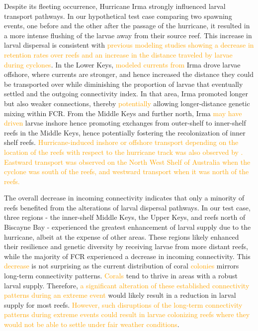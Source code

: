 \documentclass[fleqn,10pt]{wlscirep}
\newcommand{\modif}[1]{\textcolor{orange}{#1}}
\begin{document}
Despite its fleeting occurrence, Hurricane Irma strongly influenced larval transport pathways. In our hypothetical test case comparing two spawning events, one before and the other after the passage of the hurricane, it resulted in a more intense flushing of the larvae away from their source reef. This increase in larval dispersal is consistent with \modif{previous modeling studies showing a decrease in retention rates over reefs \cite{grimaldi2022hydrodynamic} and an increase in the distance traveled by larvae \citep{radford2014cyclones} during cyclones}. In the Lower Keys, \modif{modeled currents from} Irma drove larvae offshore, where currents are stronger, and hence increased the distance they could be transported over while diminishing the proportion of larvae that eventually settled and the outgoing connectivity index. In that area, Irma promoted longer but also weaker connections, thereby \modif{potentially} allowing longer-distance genetic mixing within FCR. From the Middle Keys and further north, Irma \modif{may have driven} larvae inshore hence promoting exchanges from outer-shelf to inner-shelf reefs in the Middle Keys, hence potentially fostering the recolonization of inner shelf reefs. \modif{Hurricane-induced inshore or offshore transport depending on the location of the reefs with respect to the hurricane track was also observed by \citep{radford2014cyclones}. Eastward transport was observed on the North West Shelf of Australia when the cyclone was south of the reefs, and westward transport when it was north of the reefs.}

The overall decrease in incoming connectivity indicates that only a minority of reefs benefited from the alterations of larval dispersal pathways. In our test case, three regions - the inner-shelf Middle Keys, the Upper Keys, and reefs north of Biscayne Bay - experienced the greatest enhancement of larval supply due to the hurricane, albeit at the expense of other areas. These regions likely enhanced their resilience and genetic diversity by receiving larvae from more distant reefs, while the majority of FCR experienced a decrease in incoming connectivity. This \modif{decrease} is not surprising as the current distribution of coral \modif{colonies} mirrors long-term connectivity patterns. \modif{Corals} tend to thrive in areas with a robust larval supply. Therefore, \modif{a significant alteration of these established connectivity patterns during an extreme event} would likely result in a reduction in larval supply for most reefs. \modif{However, such disruptions of the long-term connectivity patterns during extreme events could result in larvae colonizing reefs where they would not be able to settle under fair weather conditions}.
\end{document}
